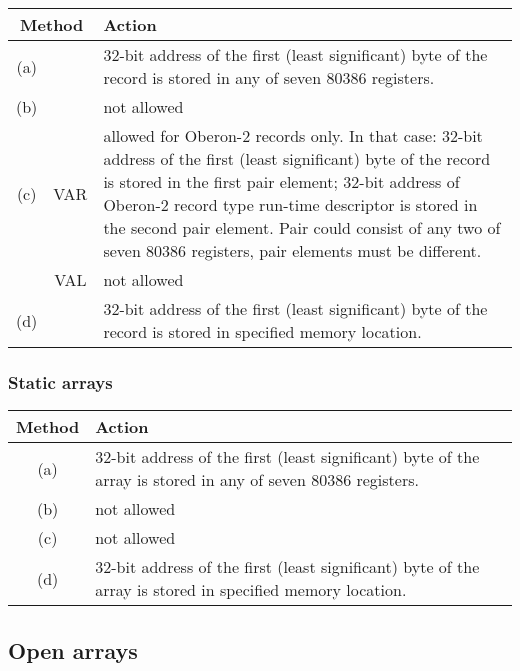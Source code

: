 \begin{tabular}{|c|c|p{8cm}|} \hline
\multicolumn{2}{|c|}{Method} & Action \\ \hline
(a) &&
         32-bit address of the first (least significant) byte
         of the record is stored in any of seven 80386 registers. \\ \hline
(b) &&   not allowed                                              \\ \hline
(c) & VAR & allowed for Oberon-2 records only.
    In that case:
      32-bit address of the first (least significant) byte
      of the record is stored in the first pair element;
      32-bit address of Oberon-2 record type run-time descriptor
      is stored in the second pair element.
      Pair could consist of any two of seven 80386 registers,
      pair elements must be different.                             \\
    & VAL & not allowed                                            \\ \hline
(d) &&
         32-bit address of the first (least significant) byte
         of the record is stored in specified memory location.     \\ \hline
\end{tabular}

\subsubsection{Static arrays}

\begin{tabular}{|c|p{8.5cm}|} \hline
Method & Action \\ \hline
(a) &
         32-bit address of the first (least significant) byte
         of the array is stored in any of seven 80386 registers. \\ \hline
(b) & not allowed                                                \\ \hline
(c) & not allowed                                                \\ \hline
(d) &
         32-bit address of the first (least significant) byte
         of the array is stored in specified memory location.    \\ \hline
\end{tabular}

\subsection{Open arrays}

